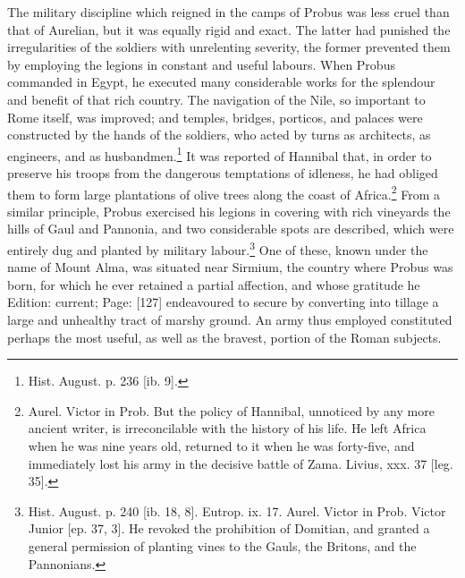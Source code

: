 The military discipline which reigned in the camps of Probus was less cruel than that of Aurelian, but it was equally rigid and exact. The latter had punished the irregularities of the soldiers with unrelenting severity, the former prevented them by employing the legions in constant and useful labours. When Probus commanded in Egypt, he executed many considerable works for the splendour and benefit of that rich country. The navigation of the Nile, so important to Rome itself, was improved; and temples, bridges, porticos, and palaces were constructed by the hands of the soldiers, who acted by turns as architects, as engineers, and as husbandmen.\footnote{Hist. August. p. 236 [ib. 9].} It was reported of Hannibal that, in order to preserve his troops from the dangerous temptations of idleness, he had obliged them to form large plantations of olive trees along the coast of Africa.\footnote{Aurel. Victor in Prob. But the policy of Hannibal, unnoticed by any more ancient writer, is irreconcilable with the history of his life. He left Africa when he was nine years old, returned to it when he was forty-five, and immediately lost his army in the decisive battle of Zama. Livius, xxx. 37 [leg. 35].} From a similar principle, Probus exercised his legions in covering with rich vineyards the hills of Gaul and Pannonia, and two considerable spots are described, which were entirely dug and planted by military labour.\footnote{Hist. August. p. 240 [ib. 18, 8]. Eutrop. ix. 17. Aurel. Victor in Prob. Victor Junior [ep. 37, 3]. He revoked the prohibition of Domitian, and granted a general permission of planting vines to the Gauls, the Britons, and the Pannonians.} One of these, known under the name of Mount Alma, was situated near Sirmium, the country where Probus was born, for which he ever retained a partial affection, and whose gratitude he Edition: current; Page: [127] endeavoured to secure by converting into tillage a large and unhealthy tract of marshy ground. An army thus employed constituted perhaps the most useful, as well as the bravest, portion of the Roman subjects.

